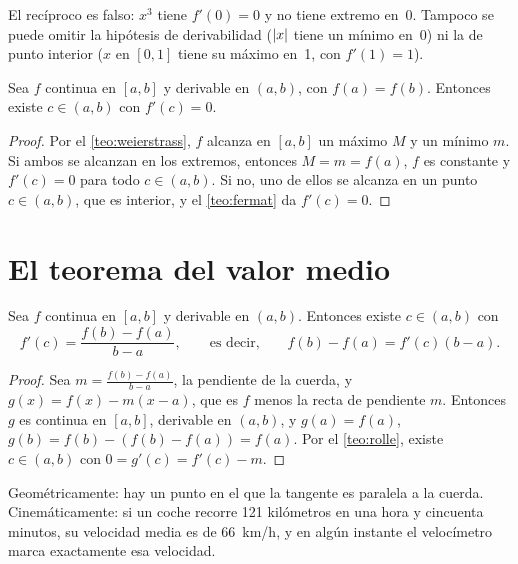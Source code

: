 El recíproco es falso: $x^{3}$ tiene $f'(0)=0$ y no tiene extremo en~0. Tampoco se puede omitir la hipótesis de derivabilidad ($\lvert x\rvert$ tiene un mínimo en~0) ni la de punto interior ($x$ en $[0,1]$ tiene su máximo en~1, con $f'(1)=1$).

\begin{teorema}[Rolle]\label{teo:rolle}
Sea $f$ continua en $[a,b]$ y derivable en $(a,b)$, con $f(a)=f(b)$. Entonces existe $c\in(a,b)$ con $f'(c)=0$.
\end{teorema}

\begin{proof}
Por el \cref{teo:weierstrass}, $f$ alcanza en $[a,b]$ un máximo $M$ y un mínimo $m$. Si ambos se alcanzan en los extremos, entonces $M=m=f(a)$, $f$ es constante y $f'(c)=0$ para todo $c\in(a,b)$. Si no, uno de ellos se alcanza en un punto $c\in(a,b)$, que es interior, y el \cref{teo:fermat} da $f'(c)=0$.
\end{proof}

\section{El teorema del valor medio}

\begin{teorema}\label{teo:tvm}
Sea $f$ continua en $[a,b]$ y derivable en $(a,b)$. Entonces existe $c\in(a,b)$ con
\[
f'(c)=\frac{f(b)-f(a)}{b-a},\qquad\text{es decir,}\qquad f(b)-f(a)=f'(c)(b-a).
\]
\end{teorema}

\begin{proof}
Sea $m=\frac{f(b)-f(a)}{b-a}$, la pendiente de la cuerda, y $g(x)=f(x)-m(x-a)$, que es $f$ menos la recta de pendiente $m$. Entonces $g$ es continua en $[a,b]$, derivable en $(a,b)$, y $g(a)=f(a)$, $g(b)=f(b)-(f(b)-f(a))=f(a)$. Por el \cref{teo:rolle}, existe $c\in(a,b)$ con $0=g'(c)=f'(c)-m$.
\end{proof}

Geométricamente: hay un punto en el que la tangente es paralela a la cuerda. Cinemáticamente: si un coche recorre 121 kilómetros en una hora y cincuenta minutos, su velocidad media es de 66~km/h, y en algún instante el velocímetro marca exactamente esa velocidad.

